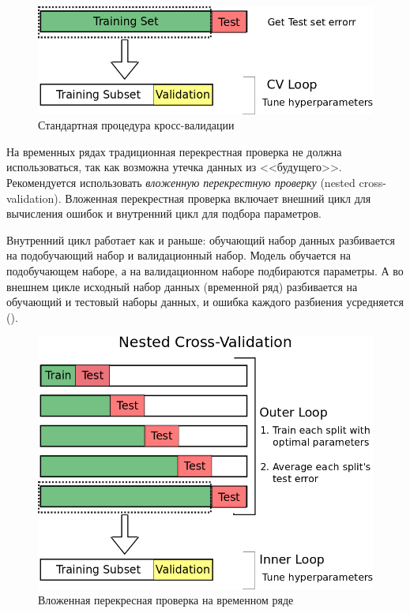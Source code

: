 \documentclass[%
	11pt,
	a4paper,
	utf8,
		]{article}
\begin{document}
\begin{figure}[h]
	\centering
	\includegraphics[scale=0.35]{figures/cv_classic.png}
	\caption{ Стандартная процедура кросс-валидации }\label{fig:cv_classic}
\end{figure}

На временных рядах традиционная перекрестная проверка не должна использоваться, так как возможна утечка данных из <<будущего>>. Рекомендуется использовать \emph{вложенную перекрестную проверку} (nested cross-validation). Вложенная перекрестная проверка включает внешний цикл для вычисления ошибок и внутренний цикл для подбора параметров. 

Внутренний цикл работает как и раньше: обучающий набор данных разбивается на подобучающий набор и валидационный набор. Модель обучается на подобучающем наборе, а на валидационном наборе подбираются параметры. А во внешнем цикле исходный набор данных (временной ряд) разбивается на обучающий и тестовый наборы данных, и ошибка каждого разбиения усредняется ().

\begin{figure}[h]
	\centering
	\includegraphics[scale=0.35]{figures/nested_cv.png}
	\caption{ Вложенная перекресная проверка на временном ряде }\label{fig:nested_cv}
\end{figure}
\end{document}
